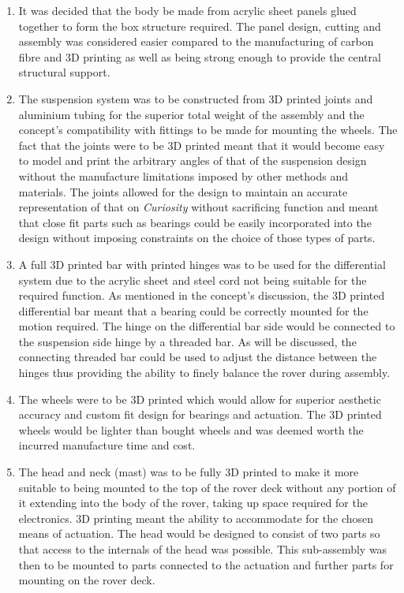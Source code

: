     \begin{enumerate}[label=\Alph*.]
      \item It was decided that the body be made from acrylic sheet panels glued together to form the box structure required. The panel design, cutting and assembly was considered easier compared to the manufacturing of carbon fibre and 3D printing as well as being strong enough to provide the central structural support.
      \item The suspension system was to be constructed from 3D printed joints and aluminium tubing for the superior total weight of the assembly and the concept's compatibility with fittings to be made for mounting the wheels. The fact that the joints were to be 3D printed meant that it would become easy to model and print the arbitrary angles of that of the suspension design without the manufacture limitations imposed by other methods and materials. The joints allowed for the design to maintain an accurate representation of that on \textit{Curiosity} without sacrificing function and meant that close fit parts such as bearings could be easily incorporated into the design without imposing constraints on the choice of those types of parts.
      \item A full 3D printed bar with printed hinges was to be used for the differential system due to the acrylic sheet and steel cord not being suitable for the required function. As mentioned in the concept's discussion, the 3D printed differential bar meant that a bearing could be correctly mounted for the motion required. The hinge on the differential bar side would be connected to the suspension side hinge by a threaded bar. As will be discussed, the connecting threaded bar could be used to adjust the distance between the hinges thus providing the ability to finely balance the rover during assembly.
      \item The wheels were to be 3D printed which would allow for superior aesthetic accuracy and custom fit design for bearings and actuation. The 3D printed wheels would be lighter than bought wheels and was deemed worth the incurred manufacture time and cost.
      \item The head and neck (mast) was to be fully 3D printed to make it more suitable to being mounted to the top of the rover deck without any portion of it extending into the body of the rover, taking up space required for the electronics. 3D printing meant the ability to accommodate for the chosen means of actuation. The head would be designed to consist of two parts so that access to the internals of the head was possible. This sub-assembly was then to be mounted to parts connected to the actuation and further parts for mounting on the rover deck.

\end{enumerate}
